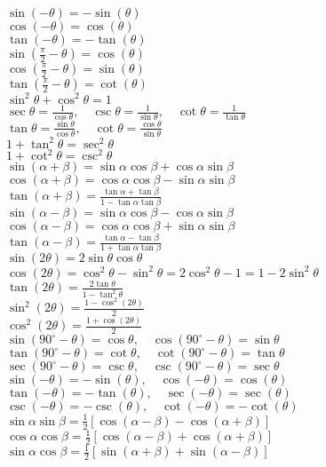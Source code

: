 \documentclass{article}
\begin{document}
$\sin(-\theta) = -\sin(\theta)$\\
$\cos(-\theta) = \cos(\theta)$\\
$\tan(-\theta) = -\tan(\theta)$\\
$\sin(\frac{\pi}{2} - \theta) = \cos(\theta)$\\
$\cos(\frac{\pi}{2} - \theta) = \sin(\theta)$\\
$\tan(\frac{\pi}{2} - \theta) = \cot(\theta)$\\
$\sin^2 \theta + \cos^2 \theta = 1 $\\
$\sec \theta = \frac{1}{\cos \theta}, \quad \csc \theta = \frac{1}{\sin \theta}, \quad \cot \theta = \frac{1}{\tan \theta} $\\
$\tan \theta = \frac{\sin \theta}{\cos \theta}, \quad \cot \theta = \frac{\cos \theta}{\sin \theta} $\\
$1 + \tan^2 \theta = \sec^2 \theta $\\
$1 + \cot^2 \theta = \csc^2 \theta $\\
$\sin(\alpha + \beta) = \sin \alpha \cos \beta + \cos \alpha \sin \beta $\\
$\cos(\alpha + \beta) = \cos \alpha \cos \beta - \sin \alpha \sin \beta $\\
$\tan(\alpha + \beta) = \frac{\tan \alpha + \tan \beta}{1 - \tan \alpha \tan \beta} $\\
$\sin(\alpha - \beta) = \sin \alpha \cos \beta - \cos \alpha \sin \beta $\\
$\cos(\alpha - \beta) = \cos \alpha \cos \beta + \sin \alpha \sin \beta $\\
$\tan(\alpha - \beta) = \frac{\tan \alpha - \tan \beta}{1 + \tan \alpha \tan \beta} $\\
$\sin(2\theta) = 2\sin \theta \cos \theta $\\
$\cos(2\theta) = \cos^2 \theta - \sin^2 \theta = 2\cos^2 \theta - 1 = 1 - 2\sin^2 \theta $\\
$\tan(2\theta) = \frac{2\tan \theta}{1 - \tan^2 \theta} $\\
$\sin^2(2\theta) = \frac{1 - \cos^2(2\theta)}{2} $\\
$\cos^2(2\theta) = \frac{1 + \cos(2\theta)}{2} $\\
$\sin(90^\circ - \theta) = \cos \theta, \quad \cos(90^\circ - \theta) = \sin \theta $\\
$\tan(90^\circ - \theta) = \cot \theta, \quad \cot(90^\circ - \theta) = \tan \theta $\\
$\sec(90^\circ - \theta) = \csc \theta, \quad \csc(90^\circ - \theta) = \sec \theta $\\
$\sin(-\theta) = -\sin(\theta), \quad \cos(-\theta) = \cos(\theta) $\\
$\tan(-\theta) = -\tan(\theta), \quad \sec(-\theta) = \sec(\theta) $\\
$\csc(-\theta) = -\csc(\theta), \quad \cot(-\theta) = -\cot(\theta) $\\
$\sin \alpha \sin \beta = \frac{1}{2} [\cos(\alpha - \beta) - \cos(\alpha + \beta)] $\\
$\cos \alpha \cos \beta = \frac{1}{2} [\cos(\alpha - \beta) + \cos(\alpha + \beta)] $\\
$\sin \alpha \cos \beta = \frac{1}{2} [\sin(\alpha + \beta) + \sin(\alpha - \beta)] $\\
\end{document}

